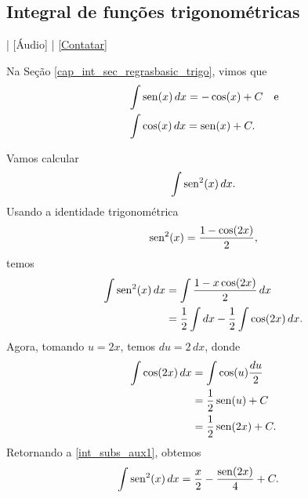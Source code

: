 \subsection{Integral de funções trigonométricas}

\begin{flushright}
  [Vídeo] | [Áudio] | \href{https://phkonzen.github.io/notas/contato.html}{[Contatar]}
\end{flushright}

Na Seção \ref{cap_int_sec_regrasbasic_trigo}, vimos que
\begin{align}
  &\int \operatorname{sen}(x)\,dx = -\cos(x) + C \quad\text{e}\\
  &\int \cos(x)\,dx = \operatorname{sen}(x) + C.
\end{align}

\begin{ex}
  Vamos calcular
  \begin{equation}
    \int \operatorname{sen}^2(x)\,dx.
  \end{equation}
  Usando a identidade trigonométrica
  \begin{equation}
    \operatorname{sen}^2(x) = \frac{1 - \cos(2x)}{2},
  \end{equation}
  temos
  \begin{align}
    \int \operatorname{sen}^2(x)\,dx &= \int \frac{1-x\cos(2x)}{2}\,dx \\
                       &= \frac{1}{2}\int dx - \frac{1}{2}\int\cos(2x)\,dx.\label{int_subs_aux1}
  \end{align}
  Agora, tomando $u = 2x$, temos $du = 2\,dx$, donde
  \begin{align}
    \int \cos(2x)\,dx &= \int\cos(u)\frac{du}{2} \\
                      &= \frac{1}{2}\operatorname{sen}(u) + C \\
                      &= \frac{1}{2}\operatorname{sen}(2x) + C.
  \end{align}
  Retornando a \ref{int_subs_aux1}, obtemos
  \begin{align}
    \int \operatorname{sen}^2(x)\,dx &= \frac{x}{2} - \frac{\operatorname{sen}(2x)}{4} + C.
  \end{align}
\end{ex}


